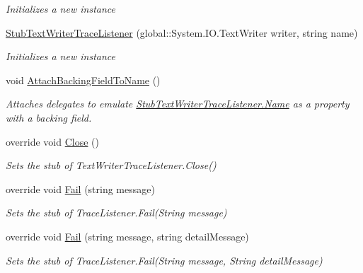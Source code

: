 \begin{DoxyCompactItemize}
\begin{DoxyCompactList}\small\item\em Initializes a new instance\end{DoxyCompactList}\item 
\hyperlink{class_system_1_1_diagnostics_1_1_fakes_1_1_stub_text_writer_trace_listener_a4145e34ca29b470134d8b6649b8c7e85}{Stub\-Text\-Writer\-Trace\-Listener} (global\-::\-System.\-I\-O.\-Text\-Writer writer, string name)
\begin{DoxyCompactList}\small\item\em Initializes a new instance\end{DoxyCompactList}\item 
void \hyperlink{class_system_1_1_diagnostics_1_1_fakes_1_1_stub_text_writer_trace_listener_a3bc7a79e61239a5a6b1697a0e5d6abd1}{Attach\-Backing\-Field\-To\-Name} ()
\begin{DoxyCompactList}\small\item\em Attaches delegates to emulate \hyperlink{class_system_1_1_diagnostics_1_1_fakes_1_1_stub_text_writer_trace_listener_a715843b2083049794e22762bbefdd2e5}{Stub\-Text\-Writer\-Trace\-Listener.\-Name} as a property with a backing field.\end{DoxyCompactList}\item 
override void \hyperlink{class_system_1_1_diagnostics_1_1_fakes_1_1_stub_text_writer_trace_listener_a2768024ee28d545f37c8933a4dfbe946}{Close} ()
\begin{DoxyCompactList}\small\item\em Sets the stub of Text\-Writer\-Trace\-Listener.\-Close()\end{DoxyCompactList}\item 
override void \hyperlink{class_system_1_1_diagnostics_1_1_fakes_1_1_stub_text_writer_trace_listener_acf98e1cddd0ba4623f1a07fa6bc1f99b}{Fail} (string message)
\begin{DoxyCompactList}\small\item\em Sets the stub of Trace\-Listener.\-Fail(\-String message)\end{DoxyCompactList}\item 
override void \hyperlink{class_system_1_1_diagnostics_1_1_fakes_1_1_stub_text_writer_trace_listener_a35f145559985aa440fcc83d511a28da1}{Fail} (string message, string detail\-Message)
\begin{DoxyCompactList}\small\item\em Sets the stub of Trace\-Listener.\-Fail(\-String message, String detail\-Message)\end{DoxyCompactList}\item 

\end{DoxyCompactItemize}
